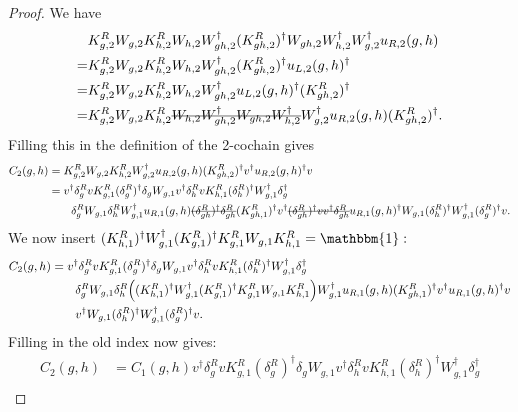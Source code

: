 \documentclass[12pt,a4paper,twoside]{article}
\newcommand{\stkout}[1]{\ifmmode\text{\sout{\ensuremath{#1}}}\else\sout{#1}\fi}
\let\originalleft\left
\let\originalright\right
\renewcommand{\left}{\mathopen{}\mathclose\bgroup\originalleft}
\renewcommand{\right}{\aftergroup\egroup\originalright}
\theoremstyle{definition}
\numberwithin{equation}{section}
\begin{document}
\begin{proof}
	We have
	\begin{align}
		&K_{g,2}^RW_{g,2}K_{h,2}^{R}W_{h,2}W_{gh,2}^\dagger(K_{gh,2}^R)^\dagger W_{gh,2}W_{h,2}^\dagger W_{g,2}^\dagger u_{R,2}(g,h)\\
		=&K_{g,2}^RW_{g,2}K_{h,2}^{R}W_{h,2}W_{gh,2}^\dagger(K_{gh,2}^R)^\dagger u_{L,2}(g,h)^\dagger\\
		=&K_{g,2}^RW_{g,2}K_{h,2}^{R}W_{h,2}W_{gh,2}^\dagger u_{L,2}(g,h)^\dagger (K_{gh,2}^R)^\dagger\\
		=&K_{g,2}^RW_{g,2}K_{h,2}^{R}\stkout{W_{h,2}W_{gh,2}^\dagger W_{gh,2}W_{h,2}^\dagger} W_{g,2}^\dagger u_{R,2}(g,h) (K_{gh,2}^R)^\dagger.
	\end{align}
	Filling this in the definition of the 2-cochain gives
	\begin{align}
		C_2(g,h)&=K_{g,2}^RW_{g,2}K_{h,2}^{R}W_{g,2}^\dagger u_{R,2}(g,h) (K_{gh,2}^R)^\dagger v^\dagger u_{R,2}(g,h)^\dagger v\\
		&=v^\dagger \delta_g^R v K_{g,1}^R (\delta_g^R)^\dagger \delta_g W_{g,1}v^\dagger \delta_h^R v K_{h,1}^R (\delta_h^R)^\dagger W_{g,1}^\dagger \delta_g^\dagger\\
		\nonumber
		&\qquad \delta_g^R W_{g,1}\delta_h^R W_{g,1}^\dagger u_{R,1}(g,h)\stkout{(\delta_{gh}^R)^\dagger \delta_{gh}^R} (K_{gh,1}^R)^\dagger v^\dagger \stkout{(\delta_{gh}^R)^\dagger v  v^\dagger \delta^R_{gh}} u_{R,1}(g,h)^\dagger W_{g,1}(\delta^R_h)^\dagger W_{g,1}^\dagger(\delta_g^R)^\dagger v.
	\end{align}
	We now insert $(K_{h,1}^R)^\dagger W_{g,1}^\dagger (K_{g,1}^R)^\dagger K_{g,1}^R W_{g,1}K_{h,1}^R=\mathbbm{1}:$
	\begin{align}	
		C_2(g,h)&=v^\dagger \delta_g^R v K_{g,1}^R (\delta_g^R)^\dagger \delta_g W_{g,1}v^\dagger \delta_h^R v K_{h,1}^R (\delta_h^R)^\dagger W_{g,1}^\dagger \delta_g^\dagger\\
		\nonumber
		&\qquad \delta_g^R W_{g,1}\delta_h^R \left((K_{h,1}^R)^\dagger W_{g,1}^\dagger (K_{g,1}^R)^\dagger K_{g,1}^R W_{g,1}K_{h,1}^R\right) W_{g,1}^\dagger u_{R,1}(g,h) (K_{gh,1}^R)^\dagger v^\dagger u_{R,1}(g,h)^\dagger v\\
		\nonumber
		&\qquad v^\dagger W_{g,1}(\delta^R_h)^\dagger W_{g,1}^\dagger(\delta_g^R)^\dagger v.
	\end{align}
	Filling in the old index now gives:
	\begin{align}
		C_2(g,h)&=C_1(g,h)v^\dagger \delta_g^R v K_{g,1}^R (\delta_g^R)^\dagger \delta_g W_{g,1}v^\dagger \delta_h^R v K_{h,1}^R (\delta_h^R)^\dagger W_{g,1}^\dagger \delta_g^\dagger\\

\end{align}
\end{proof}
\end{document}
